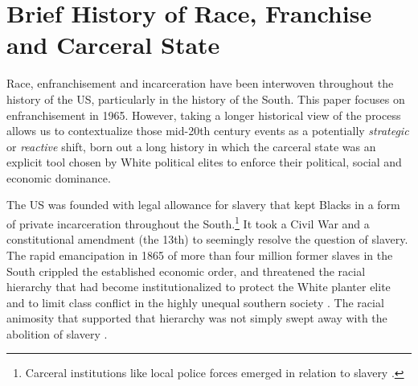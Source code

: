 \documentclass[12pt]{article}
\begin{document}
\singlespacing





\section{Brief History of Race, Franchise and Carceral State}\label{appendix_history}
\setcounter{table}{0}
\setcounter{figure}{0}
\renewcommand{\thetable}{A\arabic{table}}
\renewcommand{\thefigure}{A\arabic{figure}}
\normalsize

Race, enfranchisement and incarceration have been interwoven throughout the history of the US, particularly in the history of the South.  This paper focuses on enfranchisement in 1965.  However, taking a longer historical view of the process allows us to contextualize those mid-20th century events as a potentially \emph{strategic} or \emph{reactive} shift, born out a long history in which the carceral state was an explicit tool chosen by White political elites to enforce their political, social and economic dominance.

The US was founded with legal allowance for slavery that kept Blacks in a form of private incarceration throughout the South.\footnote{Carceral institutions like local police forces emerged in relation to slavery .}  It took a Civil War and a constitutional amendment (the 13th) to seemingly resolve the question of slavery.  The rapid emancipation in 1865 of more than four million former slaves in the South crippled the established economic order, and threatened the racial hierarchy that had become institutionalized to protect the White planter elite and to limit class conflict in the highly unequal southern society .  The racial animosity that supported that hierarchy was not simply swept away with the abolition of slavery .
\end{document}
